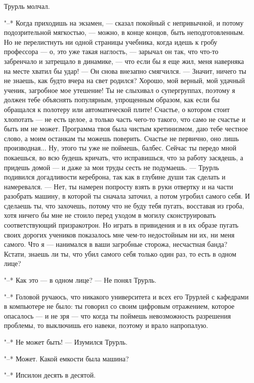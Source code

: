 Трурль молчал.

"--* Когда приходишь на экзамен, --- сказал покойный с
непривычной, и потому подозрительной мягкостью, --- можно, в
конце концов, быть неподготовленным. Но не перелистнуть ни
одной страницы учебника, когда идешь к гробу профессора --- о,
это уже такая наглость, --- зарычал он так, что что-то
забренчало и затрещало в динамике, --- что если бы я еще жил,
меня наверняка на месте хватил бы удар! --- Он снова внезапно
смягчился. --- Значит, ничего ты не знаешь, как будто вчера
на свет родился? Хорошо, мой верный, мой удачный ученик,
загробное мое утешение! Ты не слыхивал о супергруппах,
поэтому я должен тебе объяснять популярным, упрощенным
образом, как если бы обращался к полотеру или автоматической
плите! Счастье, о котором стоит хлопотать --- не есть целое, а
только часть чего-то такого, что само не счастье и быть им
не может. Программа твоя была чистым кретинизмом, даю тебе
честное слово, а моим останкам ты можешь поверить. Счастье
не первично, оно лишь производная... Ну, этого ты уже не
поймешь, балбес. Сейчас ты передо мной покаешься, во всю
будешь кричать, что исправишься, что за работу засядешь, а
придешь домой --- и даже за мои труды сесть не подумаешь. --- Трурль
подивился догадливости кереброна, так как в глубине
души так сделать и намеревался. --- Нет, ты намерен попросту
взять в руки отвертку и на части разобрать машину, в которой
ты сначала заточил, а потом угробил самого себя. И сделаешь
ты, что захочешь, потому что не буду тебя пугать, восставая
из гроба, хотя ничего бы мне не стоило перед уходом в могилу
сконструировать соответствующий призракотрон. Но играть в
привидения и в их образе пугать своих дорогих учеников
показалось мне чем-то недостойным ни их, ни меня самого. Что
я --- нанимался в ваши загробные сторожа, несчастная банда?
Кстати, знаешь ли ты, что убил самого себя только один раз,
то есть в одном лице?

"--* Как это --- в одном лице? --- Не понял Трурль.

"--* Головой ручаюсь, что никакого университета и всех его
Трурлей с кафедрами в компьютере не было: ты говорил со
своим цифровым отражением, которое опасалось --- и не зря --- что
когда ты поймешь невозможность разрешения проблемы, то
выключишь его навеки, поэтому и врало напропалую.

"--* Не может быть! --- Изумился Трурль.

"--* Может. Какой емкости была машина?

"--* Ипсилон десять в десятой.

